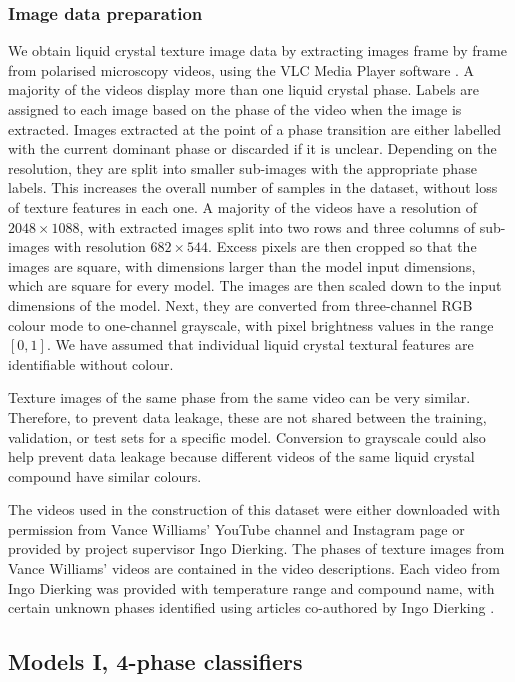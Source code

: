 \documentclass[12pt]{article}
\begin{document}
\subsubsection{Image data preparation}
\label{ImgPrep}
We obtain liquid crystal texture image data by extracting images frame by frame from polarised microscopy videos, using the VLC Media Player software \cite{VideoLan06}. A majority of the videos display more than one liquid crystal phase. Labels are assigned to each image based on the phase of the video when the image is extracted. Images extracted at the point of a phase transition are either labelled with the current dominant phase or discarded if it is unclear. Depending on the resolution, they are split into smaller sub-images with the appropriate phase labels. This increases the overall number of samples in the dataset, without loss of texture features in each one. A majority of the videos have a resolution of $2048 \times 1088$, with extracted images split into two rows and three columns of sub-images with resolution $682 \times 544$. Excess pixels are then cropped so that the images are square, with dimensions larger than the model input dimensions, which are square for every model. The images are then scaled down to the input dimensions of the model. Next, they are converted from three-channel RGB colour mode to one-channel grayscale, with pixel brightness values in the range $[0,1]$. We have assumed that individual liquid crystal textural features are identifiable without colour.

Texture images of the same phase from the same video can be very similar. Therefore, to prevent data leakage, these are not shared between the training, validation, or test sets for a specific model. Conversion to grayscale could also help prevent data leakage because different videos of the same liquid crystal compound have similar colours.

The videos used in the construction of this dataset were either downloaded with permission from Vance Williams' YouTube channel and Instagram page \cite{Williams20a, Williams20b} or provided by project supervisor Ingo Dierking. The phases of texture images from Vance Williams' videos are contained in the video descriptions. Each video from Ingo Dierking was provided with temperature range and compound name, with certain unknown phases identified using articles co-authored by Ingo Dierking \cite{Schacht95, Dierking94}.
\subsection{Models I, 4-phase classifiers}
\label{Mods1}
\end{document}

